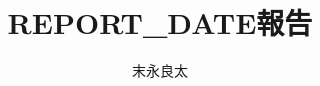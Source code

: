 \documentclass[a4paper]{jsarticle}
\begin{document}
\def\tightlist{\itemsep1pt\parskip0pt\parsep0pt}

\title{\vspace{-3cm}REPORT_DATE報告}
\author{末永良太}
\maketitle





\end{document}

